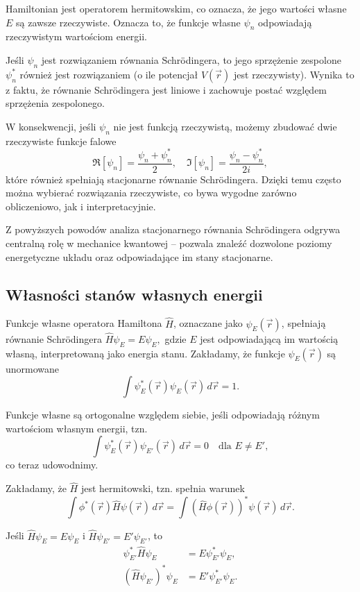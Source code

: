 Hamiltonian jest operatorem hermitowskim, co oznacza, że jego wartości własne $E$ są zawsze rzeczywiste. Oznacza to, że funkcje własne $\psi_n$ odpowiadają rzeczywistym wartościom energii.

Jeśli $\psi_n$ jest rozwiązaniem równania Schrödingera, to jego sprzężenie zespolone $\psi_n^*$ również jest rozwiązaniem (o ile potencjał $V(\vec{r})$ jest rzeczywisty). Wynika to z faktu, że równanie Schrödingera jest liniowe i zachowuje postać względem sprzężenia zespolonego.

W konsekwencji, jeśli $\psi_n$ nie jest funkcją rzeczywistą, możemy zbudować dwie rzeczywiste funkcje falowe
$$
\Re[\psi_n] = \frac{\psi_n + \psi_n^*}{2}, \quad
\Im[\psi_n] = \frac{\psi_n - \psi_n^*}{2i},
$$
które również spełniają stacjonarne równanie Schrödingera. Dzięki temu często można wybierać rozwiązania rzeczywiste, co bywa wygodne zarówno obliczeniowo, jak i interpretacyjnie.

Z powyższych powodów analiza stacjonarnego równania Schrödingera odgrywa centralną rolę w mechanice kwantowej -- pozwala znaleźć dozwolone poziomy energetyczne układu oraz odpowiadające im stany stacjonarne.

\subsection{Własności stanów własnych energii}

Funkcje własne operatora Hamiltona $\hat{H}$, oznaczane jako $\psi_E(\vec{r})$, spełniają równanie Schrödingera $\hat{H} \psi_E = E \psi_E,$ gdzie $E$ jest odpowiadającą im wartością własną, interpretowaną jako energia stanu. Zakładamy, że funkcje $\psi_E(\vec{r})$ są unormowane
$$
\int \psi_E^*(\vec{r}) \psi_E(\vec{r}) \, d\vec{r} = 1.
$$

Funkcje własne są ortogonalne względem siebie, jeśli odpowiadają różnym wartościom własnym energii, tzn.
$$
\int \psi_E^*(\vec{r}) \psi_{E'}(\vec{r}) \, d\vec{r} = 0
\quad \text{dla } E \ne E',
$$
co teraz udowodnimy.

Zakładamy, że $\hat{H}$ jest hermitowski, tzn. spełnia warunek
$$
\int \phi^*(\vec{r}) \hat{H} \psi(\vec{r}) \, d\vec{r}
= \int (\hat{H} \phi(\vec{r}))^* \psi(\vec{r}) \, d\vec{r}.
$$

Jeśli $\hat{H} \psi_E = E \psi_E$ i $\hat{H} \psi_{E'} = E' \psi_{E'}$, to
\begin{align*}
\psi_{E'}^* \hat{H} \psi_E &= E \psi_{E'}^* \psi_E, \\
(\hat{H} \psi_{E'})^* \psi_E &= E' \psi_{E'}^* \psi_E.
\end{align*}

